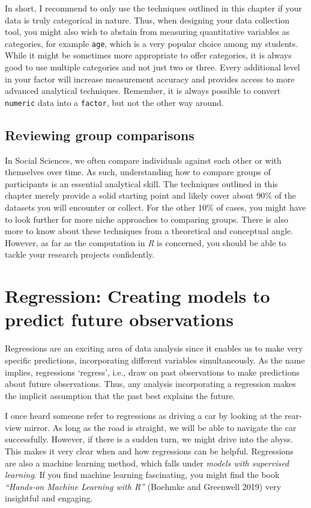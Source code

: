 \documentclass[
  letterpaper,
]{krantz}
\begin{document}
In short, I recommend to only use the techniques outlined in this
chapter if your data is truly categorical in nature. Thus, when
designing your data collection tool, you might also wish to abstain from
measuring quantitative variables as categories, for example
\texttt{age}, which is a very popular choice among my students. While it
might be sometimes more appropriate to offer categories, it is always
good to use multiple categories and not just two or three. Every
additional level in your factor will increase measurement accuracy and
provides access to more advanced analytical techniques. Remember, it is
always possible to convert \texttt{numeric} data into a \texttt{factor},
but not the other way around.

\section{Reviewing group
comparisons}\label{sec-reviewing-group-comparisons}

In Social Sciences, we often compare individuals against each other or
with themselves over time. As such, understanding how to compare groups
of participants is an essential analytical skill. The techniques
outlined in this chapter merely provide a solid starting point and
likely cover about 90\% of the datasets you will encounter or collect.
For the other 10\% of cases, you might have to look further for more
niche approaches to comparing groups. There is also more to know about
these techniques from a theoretical and conceptual angle. However, as
far as the computation in \emph{R} is concerned, you should be able to
tackle your research projects confidently.


\chapter{Regression: Creating models to predict future
observations}\label{sec-regression}

Regressions are an exciting area of data analysis since it enables us to
make very specific predictions, incorporating different variables
simultaneously. As the name implies, regressions `regress', i.e., draw
on past observations to make predictions about future observations.
Thus, any analysis incorporating a regression makes the implicit
assumption that the past best explains the future.

I once heard someone refer to regressions as driving a car by looking at
the rear-view mirror. As long as the road is straight, we will be able
to navigate the car successfully. However, if there is a sudden turn, we
might drive into the abyss. This makes it very clear when and how
regressions can be helpful. Regressions are also a machine learning
method, which falls under \emph{models with supervised learning}. If you
find machine learning fascinating, you might find the book
\emph{``Hands-on Machine Learning with R''} (Boehmke and Greenwell 2019)
very insightful and engaging.
\end{document}

